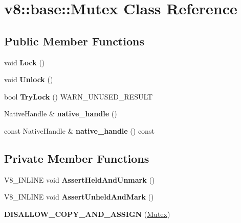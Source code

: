 \hypertarget{classv8_1_1base_1_1_mutex}{}\section{v8\+:\+:base\+:\+:Mutex Class Reference}
\label{classv8_1_1base_1_1_mutex}
\subsection*{Public Member Functions}
\begin{DoxyCompactItemize}
\item 
void {\bfseries Lock} ()\hypertarget{classv8_1_1base_1_1_mutex_ad2dc6441de065f9f5c964a90ecf93f71}{}\label{classv8_1_1base_1_1_mutex_ad2dc6441de065f9f5c964a90ecf93f71}

\item 
void {\bfseries Unlock} ()\hypertarget{classv8_1_1base_1_1_mutex_a0289de89a03aa2eea24982385cdbc62c}{}\label{classv8_1_1base_1_1_mutex_a0289de89a03aa2eea24982385cdbc62c}

\item 
bool {\bfseries Try\+Lock} () W\+A\+R\+N\+\_\+\+U\+N\+U\+S\+E\+D\+\_\+\+R\+E\+S\+U\+LT\hypertarget{classv8_1_1base_1_1_mutex_a94c4251da31c54cbf0cadb8543731e99}{}\label{classv8_1_1base_1_1_mutex_a94c4251da31c54cbf0cadb8543731e99}

\item 
Native\+Handle \& {\bfseries native\+\_\+handle} ()\hypertarget{classv8_1_1base_1_1_mutex_ae8448aa4f9a939528a856c7c8bcbd6fa}{}\label{classv8_1_1base_1_1_mutex_ae8448aa4f9a939528a856c7c8bcbd6fa}

\item 
const Native\+Handle \& {\bfseries native\+\_\+handle} () const \hypertarget{classv8_1_1base_1_1_mutex_aff7a2942e6e6b55d352951292d661b8f}{}\label{classv8_1_1base_1_1_mutex_aff7a2942e6e6b55d352951292d661b8f}

\end{DoxyCompactItemize}
\subsection*{Private Member Functions}
\begin{DoxyCompactItemize}
\item 
V8\+\_\+\+I\+N\+L\+I\+NE void {\bfseries Assert\+Held\+And\+Unmark} ()\hypertarget{classv8_1_1base_1_1_mutex_ae13cca7cc530ef76b92cd090404b4651}{}\label{classv8_1_1base_1_1_mutex_ae13cca7cc530ef76b92cd090404b4651}

\item 
V8\+\_\+\+I\+N\+L\+I\+NE void {\bfseries Assert\+Unheld\+And\+Mark} ()\hypertarget{classv8_1_1base_1_1_mutex_a2fd256a84cd554db3c9883041bef6377}{}\label{classv8_1_1base_1_1_mutex_a2fd256a84cd554db3c9883041bef6377}

\item 
{\bfseries D\+I\+S\+A\+L\+L\+O\+W\+\_\+\+C\+O\+P\+Y\+\_\+\+A\+N\+D\+\_\+\+A\+S\+S\+I\+GN} (\hyperlink{classv8_1_1base_1_1_mutex}{Mutex})\hypertarget{classv8_1_1base_1_1_mutex_a9bdd1c33421eb47d31feb4c17e03c147}{}\label{classv8_1_1base_1_1_mutex_a9bdd1c33421eb47d31feb4c17e03c147}

\end{DoxyCompactItemize}
